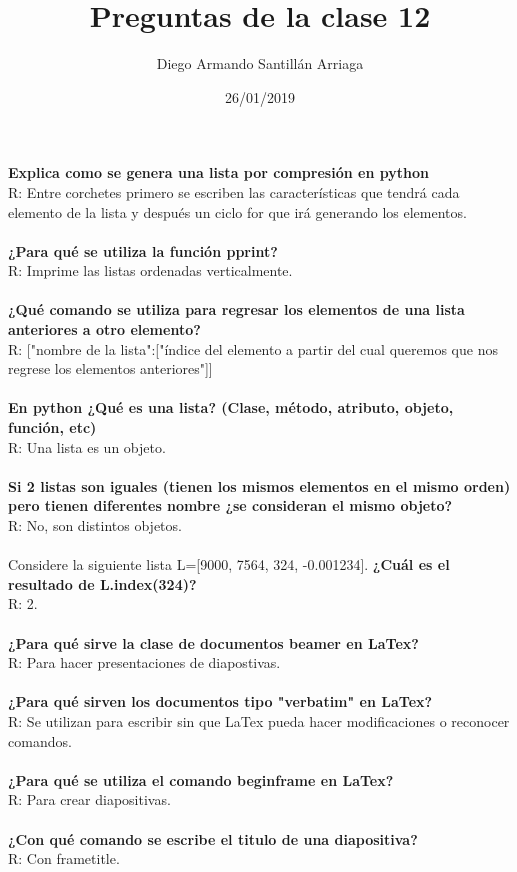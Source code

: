\documentclass[letter paper, 12pt, oneside]{article}
\title{\Huge Preguntas de la clase 12}
\author{Diego Armando Santillán Arriaga}
\date{26/01/2019}
\begin{document}
	\maketitle	
	\newpage
\textbf{Explica como se genera una lista por compresión en python}
\\
R: Entre corchetes primero se escriben las características que tendrá cada elemento de la lista y después un ciclo for que irá generando los elementos.
\\\\
\textbf{¿Para qué se utiliza la función pprint?}
\\
R: Imprime las listas ordenadas verticalmente.	
\\\\
\textbf{¿Qué comando se utiliza para regresar los elementos de una lista anteriores a otro elemento?}
\\
R: ["nombre de la lista":["índice del elemento a partir del cual queremos que nos regrese los elementos anteriores"]]
\\\\
\textbf{En python ¿Qué es una lista? (Clase, método, atributo, objeto, función, etc)}
\\
R: Una lista es un objeto. 
\\\\
\textbf{Si 2 listas son iguales (tienen los mismos elementos en el mismo orden) pero tienen diferentes nombre ¿se consideran el mismo objeto?}
\\R: No, son distintos objetos.
\\\\
Considere la siguiente lista L=[9000, 7564, 324, -0.001234]. 
\textbf{¿Cuál es el resultado de L.index(324)?}
\\
R: 2.
\\\\
\textbf{¿Para qué sirve la clase de documentos beamer en LaTex?}
\\
R: Para hacer presentaciones de diapostivas.
\\\\
\textbf{¿Para qué sirven los documentos tipo "verbatim" en LaTex?}
\\
R: Se utilizan para escribir sin que LaTex pueda hacer modificaciones o reconocer comandos. 
\\\\
\textbf{¿Para qué se utiliza el comando begin{frame} en LaTex?}
\\
R: Para crear diapositivas.
\\\\
\textbf{¿Con qué comando se escribe el titulo de una diapositiva?}
\\
R: Con frametitle. 
\end{document}
